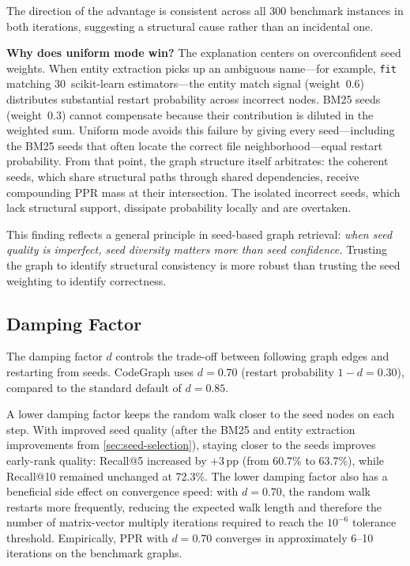 \noindent The direction of the advantage is consistent across all 300 benchmark instances in both iterations, suggesting a structural cause rather than an incidental one.

\textbf{Why does uniform mode win?} The explanation centers on overconfident seed weights. When entity extraction picks up an ambiguous name---for example, \texttt{fit} matching 30~scikit-learn estimators---the entity match signal (weight~0.6) distributes substantial restart probability across incorrect nodes. BM25 seeds (weight~0.3) cannot compensate because their contribution is diluted in the weighted sum. Uniform mode avoids this failure by giving every seed---including the BM25 seeds that often locate the correct file neighborhood---equal restart probability. From that point, the graph structure itself arbitrates: the coherent seeds, which share structural paths through shared dependencies, receive compounding PPR mass at their intersection. The isolated incorrect seeds, which lack structural support, dissipate probability locally and are overtaken.

This finding reflects a general principle in seed-based graph retrieval: \emph{when seed quality is imperfect, seed diversity matters more than seed confidence.} Trusting the graph to identify structural consistency is more robust than trusting the seed weighting to identify correctness.

\subsection{Damping Factor}
\label{sec:damping-factor}

The damping factor $d$ controls the trade-off between following graph edges and restarting from seeds. CodeGraph uses $d = 0.70$ (restart probability $1 - d = 0.30$), compared to the standard default of $d = 0.85$.

A lower damping factor keeps the random walk closer to the seed nodes on each step. With improved seed quality (after the BM25 and entity extraction improvements from \cref{sec:seed-selection}), staying closer to the seeds improves early-rank quality: Recall@5 increased by +3\,pp (from 60.7\% to 63.7\%), while Recall@10 remained unchanged at 72.3\%. The lower damping factor also has a beneficial side effect on convergence speed: with $d = 0.70$, the random walk restarts more frequently, reducing the expected walk length and therefore the number of matrix-vector multiply iterations required to reach the $10^{-6}$ tolerance threshold. Empirically, PPR with $d = 0.70$ converges in approximately 6--10 iterations on the benchmark graphs.

